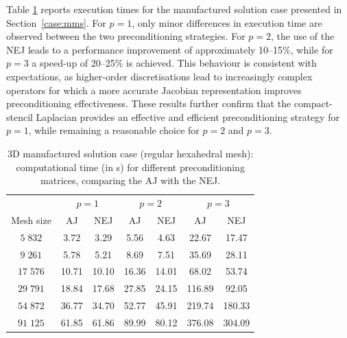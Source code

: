 \documentclass[review,3p]{elsarticle}
\begin{document}
Table \ref{tab:AJvsTJ-MMS} reports execution times for the manufactured solution case presented in Section~\ref{case:mms}.
For $p=1$, only minor differences in execution time are observed between the two preconditioning strategies. 
For $p=2$, the use of the NEJ leads to a performance improvement of approximately 10–15\%, while for $p=3$ a speed-up of 20–25\% is achieved. 
This behaviour is consistent with expectations, as higher-order discretisations lead to increasingly complex operators for which a more accurate Jacobian representation improves preconditioning effectiveness. These results further confirm that the compact-stencil Laplacian provides an effective and efficient preconditioning strategy for $p=1$, while remaining a reasonable choice for $p=2$ and $p=3$.

\begin{table}[h]
	\centering
	\begin{tabular}{ccccccc}
		\multicolumn{1}{l}{} & \multicolumn{2}{c}{$p=1$} & \multicolumn{2}{c}{$p=2$} & \multicolumn{2}{c}{$p=3$} \\
		Mesh size             & AJ          & NEJ           & AJ          & NEJ           & AJ          & NEJ        \\ \hline
		$5\;832$                  & 3.72           & 3.29            &  5.56          & 4.63          & 22.67         &  17.47        \\
		$9\;261$                 & 5.78           & 5.21            &  8.69         & 7.51         & 35.69      &  28.11            \\
		$17\;576$                  & 10.71          & 10.10            &  16.36          & 14.01       & 68.02         &  53.74           \\
		$29\;791$                  & 18.84           & 17.68            &  27.85          & 24.15        & 116.89    &   92.05              \\
		$54\;872$                 & 36.77           & 34.70            &  52.77          & 45.91         & 219.74  &   180.33                 \\
		$91\;125$                 & 61.85          & 61.86          &  89.99        & 80.12       & 376.08 &  304.09              \\ \hline
	\end{tabular}
	\caption{3D manufactured solution case (regular hexahedral mesh): computational time (in s) for different preconditioning matrices, comparing the AJ with the NEJ.}
	\label{tab:AJvsTJ-MMS}
\end{table}
\end{document}
